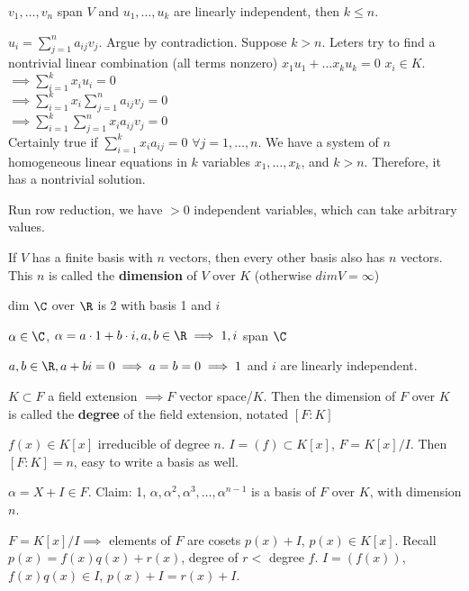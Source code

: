 \documentclass[10pt]{article}
\begin{document}
\begin{lem}
    $v_1, \ldots, v_n$ span $V$ and $u_1, \ldots, u_k$ are linearly independent, then $k \leq n$.
\end{lem}
$u_i = \sum\limits_{j = 1}^n a_{ij}v_j$. Argue by contradiction. Suppose $k > n$. Leters try to find a nontrivial linear combination (all terms nonzero) $x_1u_1 + \ldots x_ku_k = 0$ $x_i \in K$.\\
$\implies \sum\limits_{i=1}^k x_iu_i = 0$\\
$\implies \sum\limits_{i=1}^k x_i\sum\limits_{j = 1}^n a_{ij}v_j = 0$\\
$\implies \sum\limits_{i=1}^k\sum\limits_{j = 1}^n x_ia_{ij}v_j = 0$\\
Certainly true if $\sum\limits_{i = 1}^k x_ia_{ij} = 0$ $\forall j = 1,\ldots, n$. We have a system of $n$ homogeneous linear equations in $k$ variables $x_1, \ldots, x_k$, and $k > n$. Therefore, it has a nontrivial solution.

Run row reduction, we have $> 0$ independent variables, which can take arbitrary values.
\begin{cor}
    If $V$ has a finite basis with $n$ vectors, then every other basis also has $n$ vectors. This $n$ is called the \textbf{dimension} of $V$ over $K$ (otherwise $dim V = \infty$)
\end{cor}

\begin{exm*}
    dim $\C$ over $\R$ is 2 with basis 1 and $i$
\end{exm*}
$\alpha \in \C$, $\alpha = a \cdot 1 + b \cdot i, a, b \in \R \implies 1, i$ span $\C$

$a, b\in \R, a + bi = 0\implies a = b = 0 \implies 1$ and $i$ are linearly independent. 

\begin{defn}
    $K \subset F$ a field extension $\implies F$ vector space/$K$. Then the dimension of $F$ over $K$ is called the \textbf{degree} of the field extension, notated $\left[F : K\right]$
\end{defn}

\begin{lem}
    $f(x) \in K[x]$ irreducible of degree $n$. $I = (f) \subset K[x]$, $F = K[x]/I$. Then $[F : K] = n$, easy to write a basis as well.
\end{lem}
$\alpha = X + I \in F$. Claim: 1, $\alpha, \alpha^2, \alpha^3, \ldots, \alpha^{n-1}$ is a basis of $F$ over $K$, with dimension $n$.

$F = K[x]/I \implies$ elements of $F$ are cosets $p(x) + I$, $p(x) \in K[x]$. Recall $p(x) =f(x)q(x) + r(x)$, degree of $r <$ degree $f$. $I = (f(x))$, $f(x)q(x) \in I$, $p(x) + I = r(x) + I$. 
\end{document}
